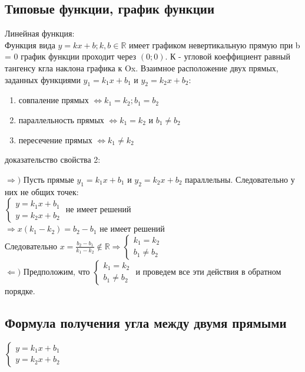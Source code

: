 \documentclass[oneside]{book}
\begin{document}
\begin{enumerate}
\section[Графики]{Типовые функции, график функции}
Линейная функция:\\
Функция вида $y = kx + b; k, b \in \mathbb{R}$ имеет графиком невертикальную прямую при b = 0 график функции проходит через $(0; 0)$.
К - угловой коеффициент равный тангенсу кгла наклона графика к Ox. Взаимное расположение двух прямых, заданных функциями
$y_1 = k_1x + b_1$ и $y_2 = k_2x + b_2$:
\begin{enumerate}
    \item совпаление прямых $\Leftrightarrow k_1 = k_2; b_1 = b_2$
    \item параллельность прямых $\Leftrightarrow k_1 = k_2 \textbf{ и } b_1 \neq b_2$
    \item пересечение прямых $\Leftrightarrow k_1 \neq k_2$
\end{enumerate}

доказательство свойства 2:
\begin{center}
    $\Rightarrow )$ Пусть прямые $y_1 = k_1x + b_1$ и $y_2 = k_2x + b_2$ параллельны. Следовательно у них не общих точек:\\
    $\begin{cases}
        y = k_1x + b_1 \\
        y = k_2x + b_2
    \end{cases}$ не имеет решений \\ $\Rightarrow x(k_1 - k_2) = b_2 - b_1$ не имеет решений\\
    Следовательно $x = \frac{b_2-b_1}{k_1-k_2} \notin \mathbb{R} \Rightarrow \begin{cases}
        k_1 = k_2 \\ b_1 \neq b_2
    \end{cases}$\\
    $\Leftarrow)$ Предположим, что $\begin{cases} k_1 = k_2 \\ b_1 \neq b_2 \end{cases}$ и проведем все эти действия в обратном порядке.
\end{center}

\subsection[угол между прямыми]{Формула получения угла между двумя прямыми}

$\begin{cases}
    y = k_1x + b_1 \\
    y = k_2x + b_2
\end{cases}$


\end{enumerate}
\end{document}
